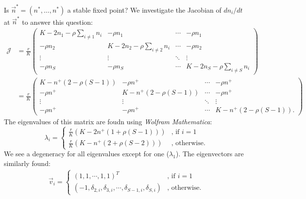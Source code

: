 \documentclass[%
 amsmath,amssymb,
 reprint,%
]{revtex4-2}
\begin{document}
\begin{widetext}
Is $\vec{n}^*=(n^*,\dots,n^*)$ a stable fixed point? We investigate the Jacobian of $dn_i/dt$ at $\vec{n}^*$ to answer this question:
\begin{align*}
\mathcal{J} &= \frac{r}{K} \begin{pmatrix}
K - 2 n_1 - \rho \sum_{i\neq 1} n_i & - \rho n_1 & \cdots & -\rho n_1 \\
- \rho n_2 & K - 2 n_2 - \rho \sum_{i\neq 2} n_i & \cdots & - \rho n_2 \\
\vdots & \vdots & \ddots & \vdots \\
- \rho n_S & - \rho n_S & \cdots & K - 2 n_S - \rho \sum_{i\neq S} n_i
\end{pmatrix} \\
&= \frac{r}{K} \begin{pmatrix}
K - n^+ (2 - \rho (S-1)) & - \rho n^+ & \cdots & -\rho n^+ \\
- \rho n^+ & K - n^+ (2 - \rho (S-1)) & \cdots & - \rho n^+ \\
\vdots & \vdots & \ddots & \vdots \\
- \rho n^+ & - \rho n^+ & \cdots & K - n^+ (2 - \rho (S-1)).
\end{pmatrix} 
\end{align*}
The eigenvalues of this matrix are foudn using \textit{Wolfram Mathematica}:
\begin{equation}
\lambda_i =
\begin{cases}
\frac{r}{K}\left( K - 2 n^+(1+\rho(S-1)) \right) & \text{, if } i=1 \\
\frac{r}{K}\left( K - n^+(2+\rho(S-2)) \right) & \text{, otherwise}.
\end{cases}
\end{equation}
We see a degeneracy for all eigenvalues except for one ($\lambda_1$). 
The eigenvectors are similarly found:
\begin{align}
\vec{v}_i =
\begin{cases}
(1,1,\cdots,1,1)^T & \text{, if } i=1 \\
(-1,\delta_{2,i},\delta_{3,i},\cdots,\delta_{S-1,i},\delta_{S,i}) & \text{, otherwise}.
\end{cases}
\end{align}


\end{widetext}
\end{document}
